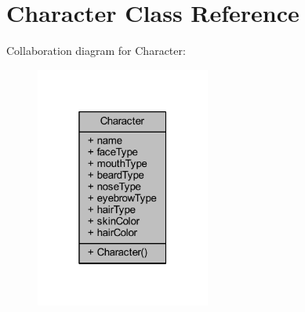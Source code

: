 \hypertarget{class_character}{}\section{Character Class Reference}
\label{class_character}


Collaboration diagram for Character\+:\nopagebreak
\begin{figure}[H]
\begin{center}
\leavevmode
\includegraphics[width=163pt]{class_character__coll__graph}
\end{center}
\end{figure}
